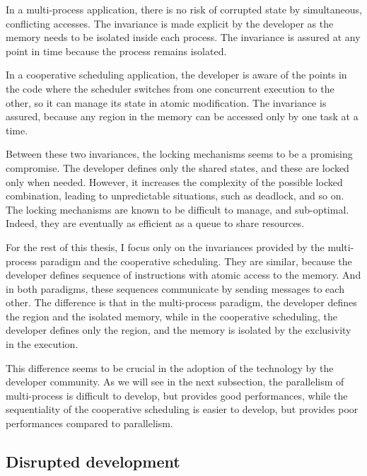 In a multi-process application, there is no risk of corrupted state by simultaneous, conflicting accesses.
The invariance is made explicit by the developer as the memory needs to be isolated inside each process.
The invariance is assured at any point in time because the process remains isolated.

In a cooperative scheduling application, the developer is aware of the points in the code where the scheduler switches from one concurrent execution to the other, so it can manage its state in atomic modification.
The invariance is assured, because any region in the memory can be accessed only by one task at a time.

Between these two invariances, the locking mechanisms seems to be a promising compromise.
The developer defines only the shared states, and these are locked only when needed.
However, it increases the complexity of the possible locked combination, leading to unpredictable situations, such as deadlock, and so on.
The locking mechanisms are known to be difficult to manage, and sub-optimal.
Indeed, they are eventually as efficient as a queue to share resources.

For the rest of this thesis, I focus only on the invariances provided by the multi-process paradigm and the cooperative scheduling.
They are similar, because the developer defines sequence of instructions with atomic access to the memory.
And in both paradigms, these sequences communicate by sending messages to each other.
The difference is that in the multi-process paradigm, the developer defines the region and the isolated memory, while in the cooperative scheduling, the developer defines only the region, and the memory is isolated by the exclusivity in the execution.

This difference seems to be crucial in the adoption of the technology by the developer community.
As we will see in the next subsection, the parallelism of multi-process is difficult to develop, but provides good performances, while the sequentiality of the cooperative scheduling is easier to develop, but provides poor performances compared to parallelism.



\subsection{Disrupted development}


